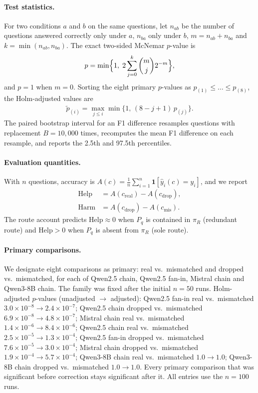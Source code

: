 \documentclass[11pt]{article}
\begin{document}
\paragraph{Test statistics.} For two conditions $a$ and $b$ on the same questions, let $n_{ab}$ be the
number of questions answered correctly only under $a$, $n_{ba}$ only under $b$, $m=n_{ab}+n_{ba}$ and
$k=\min(n_{ab},n_{ba})$. The exact two-sided McNemar $p$-value is
\begin{align*}
p=\min\Bigl\{1,\;2\sum_{j=0}^{k}\binom{m}{j}2^{-m}\Bigr\},
\end{align*}
and $p=1$ when $m=0$. Sorting the eight primary $p$-values as $p_{(1)}\le\dots\le p_{(8)}$, the Holm-adjusted
values are
\begin{align*}
\tilde p_{(i)}=\max_{j\le i}\min\{1,\,(8-j+1)\,p_{(j)}\}.
\end{align*}
The paired bootstrap interval for an F1 difference resamples questions with replacement $B=10{,}000$ times,
recomputes the mean F1 difference on each resample, and reports the 2.5th and 97.5th percentiles.

\paragraph{Evaluation quantities.} With $n$ questions, accuracy is
$A(c)=\frac{1}{n}\sum_{i=1}^{n}\mathbf{1}[\hat y_i(c)=y_i]$, and we report
\begin{align*}
\mathrm{Help} &= A(c_{\mathrm{real}})-A(c_{\mathrm{drop}}),\\
\mathrm{Harm} &= A(c_{\mathrm{drop}})-A(c_{\mathrm{mis}}).
\end{align*}
The route account predicts $\mathrm{Help}\approx 0$ when $P_q$ is contained in $\pi_R$ (redundant route) and
$\mathrm{Help}>0$ when $P_q$ is absent from $\pi_R$ (sole route).

\paragraph{Primary comparisons.} We designate eight comparisons as primary:
real vs.\ mismatched and dropped vs.\ mismatched, for each of Qwen2.5 chain,
Qwen2.5 fan-in, Mistral chain and Qwen3-8B chain. The family was fixed after
the initial $n{=}50$ runs. Holm-adjusted $p$-values (unadjusted $\to$
adjusted): Qwen2.5 fan-in real vs.\ mismatched $3.0\times10^{-8}\to
2.4\times10^{-7}$; Qwen2.5 chain dropped vs.\ mismatched $6.9\times10^{-8}\to
4.8\times10^{-7}$; Mistral chain real vs.\ mismatched $1.4\times10^{-6}\to
8.4\times10^{-6}$; Qwen2.5 chain real vs.\ mismatched $2.5\times10^{-5}\to
1.3\times10^{-4}$; Qwen2.5 fan-in dropped vs.\ mismatched $7.6\times10^{-5}\to
3.0\times10^{-4}$; Mistral chain dropped vs.\ mismatched $1.9\times10^{-4}\to
5.7\times10^{-4}$; Qwen3-8B chain real vs.\ mismatched $1.0\to1.0$; Qwen3-8B
chain dropped vs.\ mismatched $1.0\to1.0$. Every primary comparison that was
significant before correction stays significant after it. All entries use the
$n{=}100$ runs.
\end{document}
